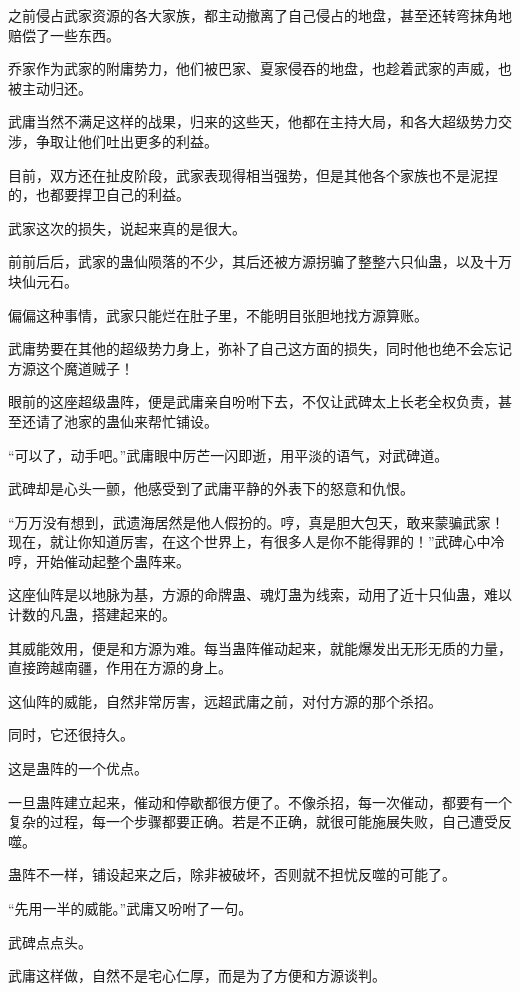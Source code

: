 \begin{this_body}
之前侵占武家资源的各大家族，都主动撤离了自己侵占的地盘，甚至还转弯抹角地赔偿了一些东西。

乔家作为武家的附庸势力，他们被巴家、夏家侵吞的地盘，也趁着武家的声威，也被主动归还。

武庸当然不满足这样的战果，归来的这些天，他都在主持大局，和各大超级势力交涉，争取让他们吐出更多的利益。

目前，双方还在扯皮阶段，武家表现得相当强势，但是其他各个家族也不是泥捏的，也都要捍卫自己的利益。

武家这次的损失，说起来真的是很大。

前前后后，武家的蛊仙陨落的不少，其后还被方源拐骗了整整六只仙蛊，以及十万块仙元石。

偏偏这种事情，武家只能烂在肚子里，不能明目张胆地找方源算账。

武庸势要在其他的超级势力身上，弥补了自己这方面的损失，同时他也绝不会忘记方源这个魔道贼子！

眼前的这座超级蛊阵，便是武庸亲自吩咐下去，不仅让武碑太上长老全权负责，甚至还请了池家的蛊仙来帮忙铺设。

“可以了，动手吧。”武庸眼中厉芒一闪即逝，用平淡的语气，对武碑道。

武碑却是心头一颤，他感受到了武庸平静的外表下的怒意和仇恨。

“万万没有想到，武遗海居然是他人假扮的。哼，真是胆大包天，敢来蒙骗武家！现在，就让你知道厉害，在这个世界上，有很多人是你不能得罪的！”武碑心中冷哼，开始催动起整个蛊阵来。

这座仙阵是以地脉为基，方源的命牌蛊、魂灯蛊为线索，动用了近十只仙蛊，难以计数的凡蛊，搭建起来的。

其威能效用，便是和方源为难。每当蛊阵催动起来，就能爆发出无形无质的力量，直接跨越南疆，作用在方源的身上。

这仙阵的威能，自然非常厉害，远超武庸之前，对付方源的那个杀招。

同时，它还很持久。

这是蛊阵的一个优点。

一旦蛊阵建立起来，催动和停歇都很方便了。不像杀招，每一次催动，都要有一个复杂的过程，每一个步骤都要正确。若是不正确，就很可能施展失败，自己遭受反噬。

蛊阵不一样，铺设起来之后，除非被破坏，否则就不担忧反噬的可能了。

“先用一半的威能。”武庸又吩咐了一句。

武碑点点头。

武庸这样做，自然不是宅心仁厚，而是为了方便和方源谈判。


\end{this_body}
